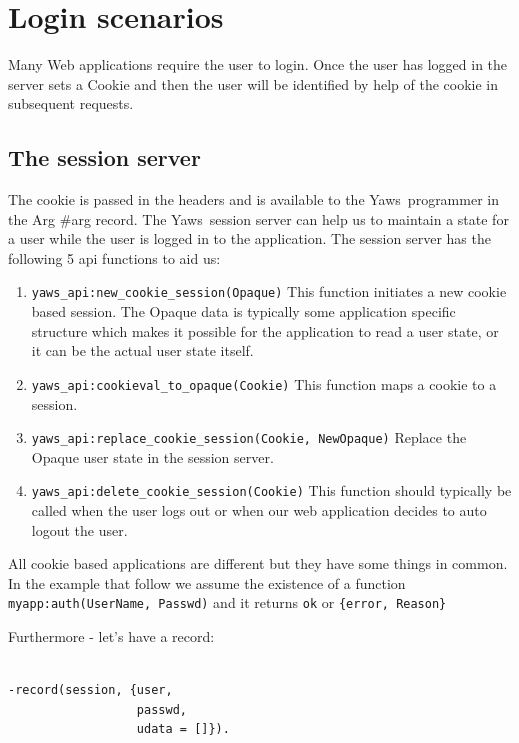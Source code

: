 \documentclass[11pt,oneside,english]{book}
\newcommand{\Yaws}            %
        {{\sc Yaws}}
\begin{document}
\section{Login scenarios}

Many Web applications require the user to login. Once the user has
logged in the server sets a Cookie and then the user will be
identified by help of the cookie in subsequent requests.

  \subsection{The session server}
The cookie is passed in the headers and is available to the \Yaws\
programmer in the Arg \#arg record. The \Yaws\  session server
can help us to maintain a state for a user while the user is
logged in to the application. The session server has the following 5
api functions to aid us:

\begin{enumerate}

\item \verb+yaws_api:new_cookie_session(Opaque)+
This function initiates a new cookie based session. The Opaque data
is typically some application specific structure which makes it
possible for the application to read a user state, or it can be the
actual user state itself.

\item \verb+yaws_api:cookieval_to_opaque(Cookie)+
This function maps a cookie to a session.

\item \verb+yaws_api:replace_cookie_session(Cookie, NewOpaque)+
Replace the Opaque user state in the session server.

\item \verb+yaws_api:delete_cookie_session(Cookie)+
This function should typically be called when the user logs out
or when our web application decides to auto logout the user.

\end{enumerate}


All cookie based applications are different but they have
some things in common. In the example that follow we assume the
existence of a function \verb+myapp:auth(UserName, Passwd)+ and it
returns \verb+ok+ or \verb+{error, Reason}+


Furthermore - let's have a record:

\begin{verbatim}

-record(session, {user,
                  passwd,
                  udata = []}).

\end{verbatim}
\end{document}
